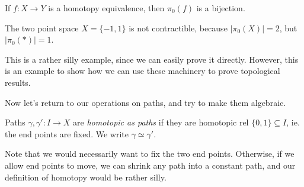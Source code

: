 \documentclass[a4paper]{article}
\begin{document}
\begin{cor}
  If $f: X\to Y$ is a homotopy equivalence, then $\pi_0(f)$ is a bijection.
\end{cor}

\begin{eg}
  The two point space $X = \{-1, 1\}$ is not contractible, because $|\pi_0(X)| = 2$, but $|\pi_0(*)| = 1$.
\end{eg}
This is a rather silly example, since we can easily prove it directly. However, this is an example to show how we can use these machinery to prove topological results.

Now let's return to our operations on paths, and try to make them algebraic.

\begin{defi}
  Paths $\gamma, \gamma': I\to X$ are \emph{homotopic as paths} if they are homotopic rel $\{0, 1\}\subseteq I$, ie. the end points are fixed. We write $\gamma\simeq \gamma'$.
\end{defi}
\begin{center}
\end{center}
Note that we would necessarily want to fix the two end points. Otherwise, if we allow end points to move, we can shrink any path into a constant path, and our definition of homotopy would be rather silly.
\end{document}
